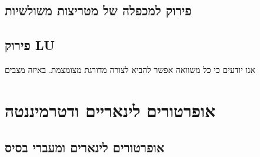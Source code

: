 \documentclass{tstextbook}
\begin{document}
\section{פירוק למכפלה של מטריצות משולשיות}

\section{פירוק LU}

אנו יודעים כי כל משוואה אפשר להביא לצורה מדורגת מצומצמת. באיזה מצבים 

\chapter{אופרטורים לינאריים ודטרמיננטה}

\section{אופרטורים לינארים ומעברי בסיס}
\end{document}

